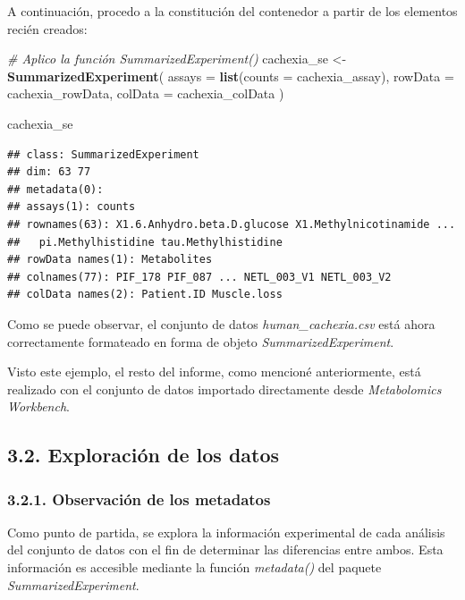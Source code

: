 \documentclass[
]{article}
\newenvironment{Shaded}{\begin{snugshade}}{\end{snugshade}}
\newcommand{\AttributeTok}[1]{\textcolor[rgb]{0.13,0.29,0.53}{#1}}
\newcommand{\CommentTok}[1]{\textcolor[rgb]{0.56,0.35,0.01}{\textit{#1}}}
\newcommand{\FunctionTok}[1]{\textcolor[rgb]{0.13,0.29,0.53}{\textbf{#1}}}
\newcommand{\NormalTok}[1]{#1}
\newcommand{\OtherTok}[1]{\textcolor[rgb]{0.56,0.35,0.01}{#1}}
\begin{document}
A continuación, procedo a la constitución del contenedor a partir de los
elementos recién creados:

\begin{Shaded}
\begin{Highlighting}[]
\CommentTok{\# Aplico la función SummarizedExperiment()}
\NormalTok{cachexia\_se }\OtherTok{\textless{}{-}} \FunctionTok{SummarizedExperiment}\NormalTok{(}
  \AttributeTok{assays =} \FunctionTok{list}\NormalTok{(}\AttributeTok{counts =}\NormalTok{ cachexia\_assay),}
  \AttributeTok{rowData =}\NormalTok{ cachexia\_rowData,}
  \AttributeTok{colData =}\NormalTok{ cachexia\_colData}
\NormalTok{)}

\NormalTok{cachexia\_se}
\end{Highlighting}
\end{Shaded}

\begin{verbatim}
## class: SummarizedExperiment 
## dim: 63 77 
## metadata(0):
## assays(1): counts
## rownames(63): X1.6.Anhydro.beta.D.glucose X1.Methylnicotinamide ...
##   pi.Methylhistidine tau.Methylhistidine
## rowData names(1): Metabolites
## colnames(77): PIF_178 PIF_087 ... NETL_003_V1 NETL_003_V2
## colData names(2): Patient.ID Muscle.loss
\end{verbatim}

Como se puede observar, el conjunto de datos \emph{human\_cachexia.csv}
está ahora correctamente formateado en forma de objeto
\emph{SummarizedExperiment}.

Visto este ejemplo, el resto del informe, como mencioné anteriormente,
está realizado con el conjunto de datos importado directamente desde
\emph{Metabolomics Workbench}.

\subsection{3.2. Exploración de los
datos}\label{exploraciuxf3n-de-los-datos}

\subsubsection{3.2.1. Observación de los
metadatos}\label{observaciuxf3n-de-los-metadatos}

Como punto de partida, se explora la información experimental de cada
análisis del conjunto de datos con el fin de determinar las diferencias
entre ambos. Esta información es accesible mediante la función
\emph{metadata()} del paquete \emph{SummarizedExperiment}.
\end{document}
